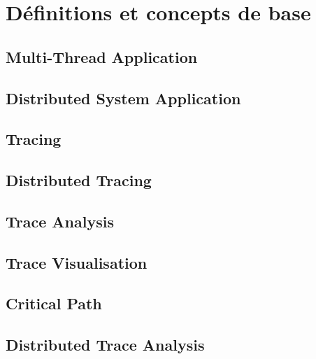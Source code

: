 \label{sec:Introduction}  %


\section{Définitions et concepts de base}  %

\subsection{Multi-Thread Application}

\subsection{Distributed System Application}

\subsection{Tracing}

\subsection{Distributed Tracing}

\subsection{Trace Analysis}

\subsection{Trace Visualisation}

\subsection{Critical Path}

\subsection{Distributed Trace Analysis}

